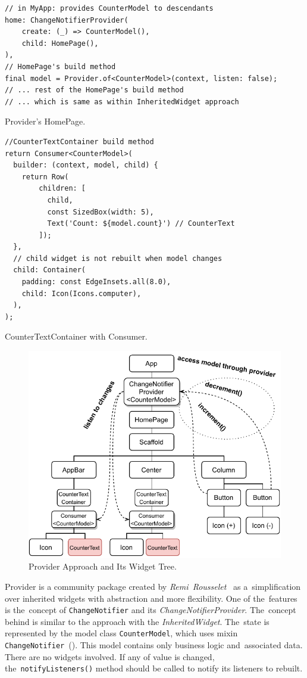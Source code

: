 \begin{listing}[ht]
\begin{verbatim}
// in MyApp: provides CounterModel to descendants
home: ChangeNotifierProvider(
    create: (_) => CounterModel(),
    child: HomePage(),
),
// HomePage's build method
final model = Provider.of<CounterModel>(context, listen: false);
// ... rest of the HomePage's build method
// ... which is same as within InheritedWidget approach
\end{verbatim}
\caption{Provider's HomePage.}
\label{listing:counter-provider-home-page}
\end{listing}

\begin{listing}[ht]
\begin{verbatim}
//CounterTextContainer build method
return Consumer<CounterModel>(
  builder: (context, model, child) {
    return Row(
        children: [
          child,
          const SizedBox(width: 5),
          Text('Count: ${model.count}') // CounterText
        ]);
  },
  // child widget is not rebuilt when model changes
  child: Container(
    padding: const EdgeInsets.all(8.0),
    child: Icon(Icons.computer),
  ),
);
\end{verbatim}
\caption{CounterTextContainer with Consumer.}
\label{listing:counter-provider-consumer}
\end{listing}

\begin{figure}[ht]
    \centering
    \includegraphics[width=0.75\linewidth]{img/flutter/counter-provider.pdf}
    \caption{Provider Approach and Its Widget Tree.}
    \label{fig:counter-app-provider}
\end{figure}

Provider is a community package created by \textit{Remi~Rousselet}~\cite{package-provider} as a~simplification over inherited widgets with abstraction and more flexibility. One of the~features is the~concept of \verb|ChangeNotifier| and its \textit{ChangeNotifierProvider}. The~concept behind is similar to the approach with the \textit{InheritedWidget}. The~state is represented by the model class \verb|CounterModel|, which uses mixin \verb|ChangeNotifier|~(). This model contains only business logic and~associated data. There are no widgets involved. If any of value is changed, the~\verb|notifyListeners()| method should be called to notify its listeners to rebuilt.

